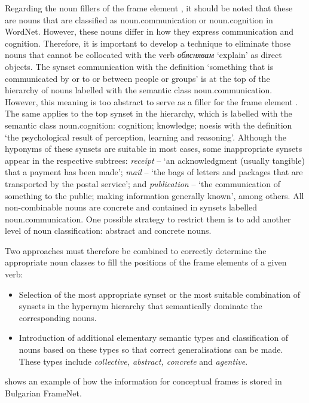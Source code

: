 \documentclass[output=paper,colorlinks,citecolor=brown]{langscibook}
\begin{document}
Regarding the noun fillers of the frame element , it should be noted that these are nouns that are classified as noun.communication or noun.cognition in WordNet. However, these nouns differ in how they express communication and cognition. Therefore, it is important to develop a technique to eliminate those nouns that cannot be collocated with the verb \textit{обяснявам} `explain' as direct objects. The synset {communication} with the definition `something that is communicated by or to or between people or groups'  is at the top of the hierarchy  of nouns labelled with the semantic class noun.communication. However, this meaning is too abstract to serve as a filler for the frame element . The same applies to the top synset in the hierarchy, which is labelled with the semantic class noun.cognition: {cognition; knowledge; noesis} with the definition `the psychological result of perception, learning and reasoning'. Although the hyponyms of these synsets are suitable in most cases, some inappropriate synsets appear in the respective subtrees: \emph{receipt} -- `an acknowledgment (usually tangible) that a payment has been made'; \emph{mail} -- `the bags of letters and packages that are transported by the postal service'; and \emph{publication} -- `the communication of something to the public; making information generally known', among others. All non-combinable nouns are concrete and contained in synsets labelled noun.communication. One possible strategy to restrict them is to add another level of noun classification: abstract and concrete nouns.

Two approaches must therefore be combined to correctly determine the appropriate noun classes to fill the positions of the frame elements of a given verb:

\begin{itemize}

\item Selection of the most appropriate synset or the most suitable combination of synsets in the hypernym hierarchy that semantically dominate the corresponding nouns.
 \item Introduction of additional elementary semantic types and classification of nouns based on these types so that correct generalisations can be made. These types include \textit{collective, abstract, concrete} and \textit{agentive}.
 
\end{itemize}

 shows an example of how the information for conceptual frames is stored in Bulgarian FrameNet.
\end{document}
